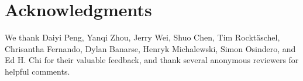 \documentclass{article}
\theoremstyle{plain}
\theoremstyle{definition}
\theoremstyle{remark}
\begin{document}
\section*{Acknowledgments}

We thank Daiyi Peng, Yanqi Zhou, Jerry Wei, Shuo Chen, Tim Rocktäschel, Chrisantha Fernando, Dylan Banarse, Henryk Michalewski, Simon Osindero, and Ed H. Chi for their valuable feedback, and thank several anonymous reviewers for helpful comments.




\newpage
\appendix


\end{document}
